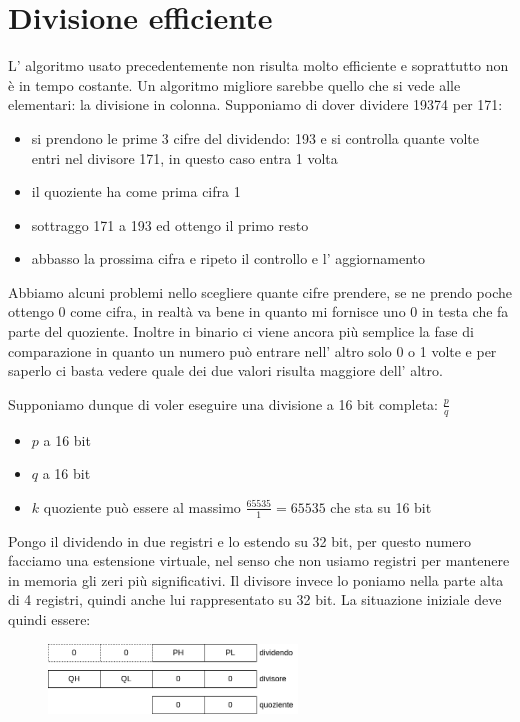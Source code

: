\section{Divisione efficiente}
L' algoritmo usato precedentemente non risulta molto efficiente e soprattutto non è in tempo costante.
Un algoritmo migliore sarebbe quello che si vede alle elementari: la divisione in colonna.
Supponiamo di dover dividere 19374 per 171:
\begin{itemize}
    \item si prendono le prime 3 cifre del dividendo: 193 e si controlla quante volte entri nel divisore 171, in questo caso entra 1 volta
    
    \item il quoziente ha come prima cifra 1

    \item sottraggo 171 a 193 ed ottengo il primo resto
    
    \item abbasso la prossima cifra e ripeto il controllo e l' aggiornamento
\end{itemize}
Abbiamo alcuni problemi nello scegliere quante cifre prendere, se ne prendo poche ottengo 0 come cifra, in realtà va bene in quanto mi fornisce uno 0 in testa che fa parte del quoziente.
Inoltre in binario ci viene ancora più semplice la fase di comparazione in quanto un numero può entrare nell' altro solo 0 o 1 volte e per saperlo ci basta vedere quale dei due valori risulta maggiore dell' altro.

Supponiamo dunque di voler eseguire una divisione a 16 bit completa: $\frac{p}{q}$
\begin{itemize}
    \item $p$ a 16 bit
    \item $q$ a 16 bit
    \item $k$ quoziente può essere al massimo $\frac{65535}{1} = 65535$ che sta su 16 bit
\end{itemize}

Pongo il dividendo in due registri e lo estendo su 32 bit, per questo numero facciamo una estensione virtuale, nel senso che non usiamo registri per mantenere in memoria gli zeri più significativi.
Il divisore invece lo poniamo nella parte alta di 4 registri, quindi anche lui rappresentato su 32 bit.
La situazione iniziale deve quindi essere:
\begin{figure}[H]
    \centering
    \includegraphics[width=250px]{images/12_Divisione_efficiente/divisione_fast.png}
\end{figure}

